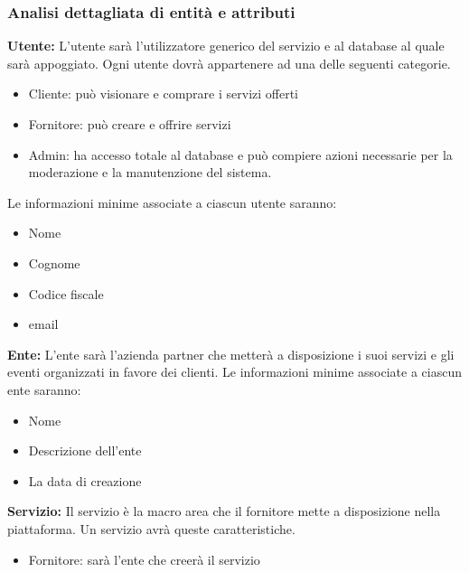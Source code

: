 

\endgroup
\subsubsection{Analisi dettagliata di entità e attributi}

\textbf{Utente:} L'utente sarà l'utilizzatore generico del servizio e al database al quale sarà appoggiato. 
Ogni utente dovrà appartenere ad una delle seguenti categorie. 
\begin{itemize}
    \item Cliente: può visionare e comprare i servizi offerti
    \item Fornitore: può creare e offrire servizi
    \item Admin: ha accesso totale al database e può compiere azioni necessarie per la moderazione e la manutenzione del sistema.
\end{itemize}
Le informazioni minime associate a ciascun utente saranno: 
\begin{itemize}
    \item Nome
    \item Cognome
    \item Codice fiscale
    \item email
\end{itemize}

\textbf{Ente:} L'ente sarà l'azienda partner che metterà a disposizione i suoi servizi e gli eventi organizzati in favore dei clienti.
Le informazioni minime associate a ciascun ente saranno:
\begin{itemize}
    \item Nome
    \item Descrizione dell'ente
    \item La data di creazione
\end{itemize}

\textbf{Servizio:} Il servizio è la macro area che il fornitore mette a disposizione nella piattaforma.
Un servizio avrà queste caratteristiche.
\begin{itemize}
    \item Fornitore: sarà l'ente che creerà il servizio
\end{itemize}

